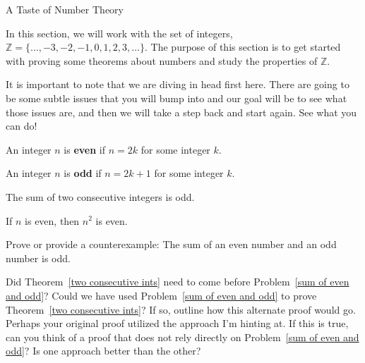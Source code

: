 \begin{section}{A Taste of Number Theory}


In this section, we will work with the set of integers, $\mathbb{Z} = \{\ldots, -3, -2, -1, 0, 1, 2, 3, \ldots\}$.  The purpose of this section is to get started with proving some theorems about numbers and study the properties of $\mathbb{Z}$.

It is important to note that we are diving in head first here.  There are going to be some subtle issues that you will bump into and our goal will be to see what those issues are, and then we will take a step back and start again.  See what you can do!

\begin{definition}
An integer $n$ is \textbf{even} if $n=2k$ for some integer $k$. \end{definition}

\begin{definition}
An integer $n$ is \textbf{odd} if $n=2k+1$ for some integer $k$. \end{definition}

\begin{theorem}\label{two consecutive ints}
The sum of two consecutive integers is odd.
\end{theorem}

\begin{theorem}
If $n$ is even, then $n^2$ is even.
\end{theorem}

\begin{problem}\label{sum of even and odd}
Prove or provide a counterexample:  The sum of an even number and an odd number is odd.
\end{problem}

\begin{question}
Did Theorem~\ref{two consecutive ints} need to come before Problem~\ref{sum of even and odd}?  Could we have used Problem~\ref{sum of even and odd} to prove Theorem~\ref{two consecutive ints}?  If so, outline how this alternate proof would go.  Perhaps your original proof utilized the approach I'm hinting at.  If this is true, can you think of a proof that does not rely directly on Problem~\ref{sum of even and odd}?  Is one approach better than the other?
\end{question}


\end{section}
